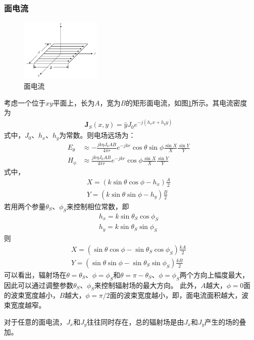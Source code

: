 \documentclass{article}
\numberwithin{equation}{section}
\begin{document}
\subsubsection{面电流}
\begin{figure}[ht]
    \centering
    \includegraphics[width=0.35\textwidth]{面电流.PNG}
    \caption{面电流}
    \label{fig:fig4}
\end{figure}
考虑一个位于$xy$平面上，长为$A$，宽为$B$的矩形面电流，如图\ref{fig:fig4}所示。其电流密度为
\begin{align}
    \label{eq:eq139}
    \mathbf{J}_S(x,y)=\hat{y}J_0e^{-j(h_xx+h_yy)}
\end{align}
式中，$J_0$、$h_x$、$h_y$为常数。则电场远场为：
\begin{align}
    \label{eq:eq137}
    E_{\theta}&\approx-\frac{jk\eta J_0AB}{4\pi r}e^{-jkr}\cos\theta\sin\phi\frac{\sin X}{X}\frac{\sin Y}{Y} \\
    \label{eq:eq138}
    H_{\phi}&\approx\frac{jk\eta J_0AB}{4\pi r}e^{-jkr}\cos\phi\frac{\sin X}{X}\frac{\sin Y}{Y}
\end{align}
式中，
\begin{align}
    \label{eq:eq140}
    X=(k\sin\theta\cos\phi-h_x)\frac{A}{2} \\
    \label{eq:eq141}
    Y=(k\sin\theta\sin\phi-h_y)\frac{B}{2}
\end{align}
若用两个参量$\theta_{S}$、$\phi_{S}$来控制相位常数，即
\begin{align}
    \label{eq:eq142}
    h_x=k\sin\theta_{S}\cos\phi_{S} \\
    \label{eq:eq143}
    h_y=k\sin\theta_{S}\sin\phi_{S}
\end{align}
则
\begin{align}
    \label{eq:eq144}
    X=(\sin\theta\cos\phi-\sin\theta_{S}\cos\phi_{S})\frac{kA}{2} \\
    \label{eq:eq145}
    Y=(\sin\theta\sin\phi-\sin\theta_{S}\sin\phi_{S})\frac{kB}{2}
\end{align}
可以看出，辐射场在$\theta=\theta_S$、$\phi=\phi_S$和$\theta=\pi-\theta_S$、$\phi=\phi_S$两个方向上幅度最大，因此可以通过调整参数$\theta_{S}$、$\phi_{S}$来控制辐射场的最大方向。
此外，$A$越大，$\phi=0$面的波束宽度越小，$B$越大，$\phi=\pi/2$面的波束宽度越小，即，面电流面积越大，波束宽度越窄。
\par
对于任意的面电流，$J_x$和$J_y$往往同时存在，总的辐射场是由$J_x$和$J_y$产生的场的叠加。
\end{document}
